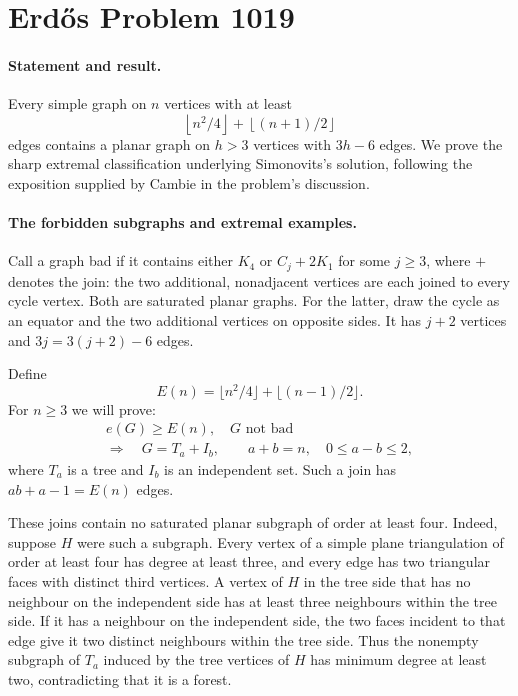 \section*{Erd\H{o}s Problem 1019}

\paragraph{Statement and result.}
Every simple graph on \(n\) vertices with at least
\[
 \left\lfloor n^2/4\right\rfloor+
 \left\lfloor(n+1)/2\right\rfloor
\]
edges contains a planar graph on \(h>3\) vertices with \(3h-6\) edges. We prove the sharp extremal classification underlying Simonovits's solution, following the exposition supplied by Cambie in the problem's discussion.

\paragraph{The forbidden subgraphs and extremal examples.}
Call a graph bad if it contains either \(K_4\) or \(C_j+2K_1\) for some \(j\geq3\), where \(+\) denotes the join: the two additional, nonadjacent vertices are each joined to every cycle vertex. Both are saturated planar graphs. For the latter, draw the cycle as an equator and the two additional vertices on opposite sides. It has \(j+2\) vertices and \(3j=3(j+2)-6\) edges.

Define
\[
 E(n)=\lfloor n^2/4\rfloor+\lfloor(n-1)/2\rfloor.
\]
For \(n\geq3\) we will prove:
\[
 \begin{gathered}
 e(G)\geq E(n),\quad G\text{ not bad}\\
 \Longrightarrow\quad
 G=T_a+I_b,\qquad a+b=n,\quad 0\leq a-b\leq2,
 \tag{1}
 \end{gathered}
\]
where \(T_a\) is a tree and \(I_b\) is an independent set. Such a join has \(ab+a-1=E(n)\) edges.

These joins contain no saturated planar subgraph of order at least four. Indeed, suppose \(H\) were such a subgraph. Every vertex of a simple plane triangulation of order at least four has degree at least three, and every edge has two triangular faces with distinct third vertices. A vertex of \(H\) in the tree side that has no neighbour on the independent side has at least three neighbours within the tree side. If it has a neighbour on the independent side, the two faces incident to that edge give it two distinct neighbours within the tree side. Thus the nonempty subgraph of \(T_a\) induced by the tree vertices of \(H\) has minimum degree at least two, contradicting that it is a forest.

